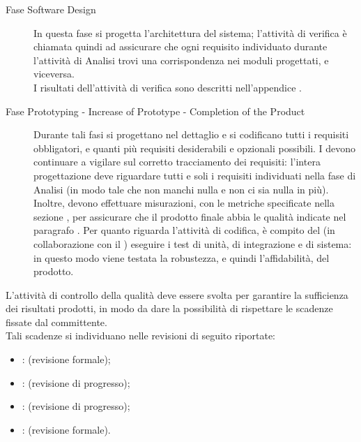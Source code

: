 \begin{description}
		\item[Fase Software Design] In questa fase si progetta l'architettura del sistema; l'attività di verifica è chiamata quindi ad assicurare che ogni requisito individuato durante l'attività di Analisi trovi una corrispondenza nei moduli progettati, e viceversa. \\
		I risultati dell'attività di verifica sono descritti nell'appendice .\\
		\item[Fase Prototyping - Increase of Prototype - Completion of the Product] Durante tali fasi si progettano nel dettaglio e si codificano tutti i requisiti obbligatori, e quanti più requisiti desiderabili e opzionali possibili.
		I  devono continuare a vigilare sul corretto tracciamento dei requisiti: l'intera progettazione deve riguardare tutti e soli i requisiti individuati nella fase di Analisi (in modo tale che non manchi nulla e non ci sia nulla in più). Inoltre, devono effettuare misurazioni, con le metriche specificate nella sezione , per assicurare che il prodotto finale abbia le qualità indicate nel paragrafo .
		Per quanto riguarda l'attività di codifica, è compito del  (in collaborazione con il ) eseguire i test di unità, di 
		integrazione e di sistema: in questo modo viene testata la robustezza, e quindi l'affidabilità, del prodotto.\\
		\end{description}
			L'attività di controllo della qualità deve essere svolta per garantire la sufficienza dei risultati prodotti, in modo da dare la possibilità di rispettare le scadenze fissate dal committente.\\
			Tali scadenze si individuano nelle revisioni di seguito riportate:
			\begin{itemize}
				\item {}:  (revisione formale);
				\item {}:  (revisione di progresso);
				\item {}:  (revisione di progresso);
				\item {}:  (revisione formale).
			\end{itemize}
